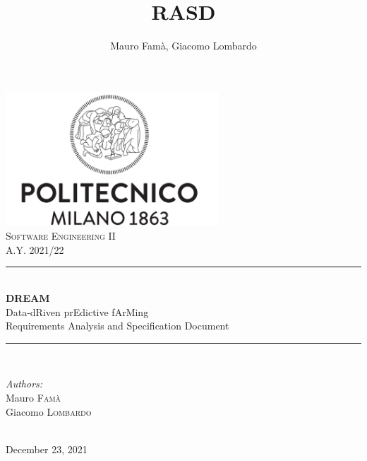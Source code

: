\documentclass[10pt]{article}
\title{RASD}
\author{Mauro Famà, Giacomo Lombardo}
\begin{document}
\thispagestyle{empty}
\begin{titlepage}
    \newcommand{\HRule}{\rule{\linewidth}{0.5mm}}
    \center
    \includegraphics[width=8cm]{polimi.png}\\[1cm]

    \textsc{\Large Software Engineering II}\\[0.5cm]
    \textsc{\large A.Y. 2021/22}\\[0.5cm]

    \HRule \\[0.4cm]
        { \Huge \bfseries DREAM}\\[0.2cm]
        { \large Data-dRiven prEdictive fArMing}\\[0.4cm]
        { \LARGE Requirements Analysis and Specification Document}
    \HRule \\[1.5cm]

    \begin{minipage}{0.4\textwidth}
        \begin{flushleft} \large
        \emph{Authors:}\\
        Mauro \textsc{Famà}\\
        Giacomo \textsc{Lombardo}\\
        \end{flushleft}
    \end{minipage}\\[2cm]

    {\large December 23, 2021}\\[2cm]
    
    \vfill
\end{titlepage}
\newpage
\tableofcontents %
\newpage
\end{document}
